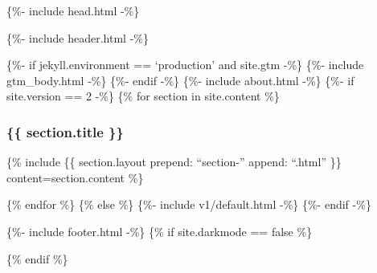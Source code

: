 \{\%- include head.html -\%\}

\{\%- include header.html -\%\}

\{\%- if jekyll.environment == `production' and site.gtm -\%\} \{\%-
include gtm\_body.html -\%\} \{\%- endif -\%\} \{\%- include about.html
-\%\} \{\%- if site.version == 2 -\%\} \{\% for section in site.content
\%\}

\subsubsection{\{\{ section.title \}\}}\label{section.title}

\{\% include \{\{ section.layout \textbar{} prepend: ``section-''
\textbar{} append: ``.html'' \}\} content=section.content \%\}

\{\% endfor \%\} \{\% else \%\} \{\%- include v1/default.html -\%\}
\{\%- endif -\%\}

\{\%- include footer.html -\%\} \{\% if site.darkmode == false \%\}

\{\% endif \%\}
